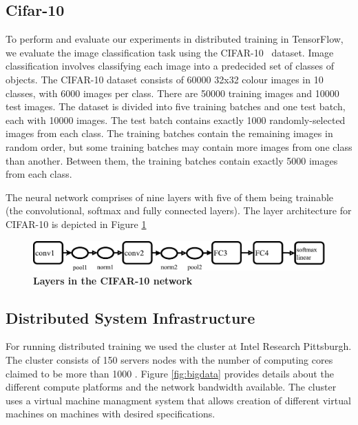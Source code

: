 \subsection{Cifar-10}
To perform and evaluate our experiments in distributed training in TensorFlow, we evaluate the image classification task using the CIFAR-10~\cite{cifar10} dataset. Image classification involves classifying each image into a predecided set of classes of objects. The CIFAR-10 dataset consists of 60000 32x32 colour images in 10 classes, with 6000 images per class. There are 50000 training images and 10000 test images. The dataset is divided into five training batches and one test batch, each with 10000 images. The test batch contains exactly 1000 randomly-selected images from each class. The training batches contain the remaining images in random order, but some training batches may contain more images from one class than another. Between them, the training batches contain exactly 5000 images from each class. 

The neural network comprises of nine layers with five of them being trainable (the convolutional, softmax and fully connected layers). The layer architecture for CIFAR-10 is depicted in Figure \ref{fig:cifar10}

\begin{figure}[h]
\centering
  \includegraphics[keepaspectratio,width=\columnwidth]{figures/Cifar10_tensorflow.pdf}
  \caption{\textbf{Layers in the CIFAR-10 network}}
  \label{fig:cifar10}
\end{figure}

\subsection{Distributed System Infrastructure}

For running distributed training we used the cluster
at Intel Research Pittsburgh. The cluster consists 
of 150 servers nodes with the number of computing
cores claimed to be more than 1000 \cite{tashi}.
Figure \ref{fig:bigdata} provides details about the
different compute platforms and the network
bandwidth available. The cluster uses a virtual machine
managment system \cite{tashi} that allows creation of different virtual
machines on machines with desired specifications.

